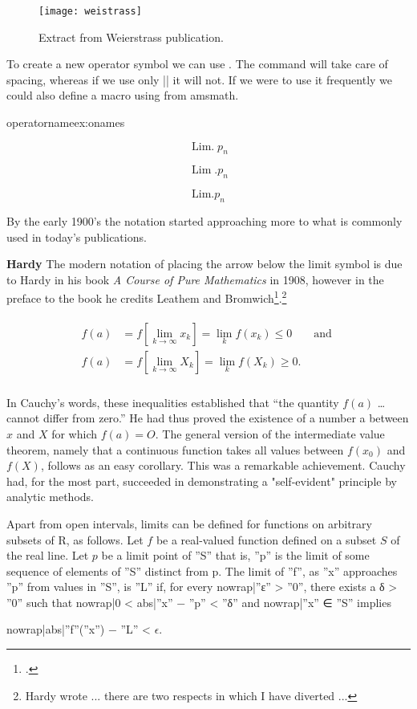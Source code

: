 {\begin{figure}[htbp]
\centering
\texttt{[image: weistrass]}
\caption{Extract from Weierstrass publication.}
\label{weis}

\end{figure}

To create a new operator symbol we can use . The command will take care of spacing, whereas if we use only
|\mathrm| it will not. If we were to use it frequently we could also define a macro using  from amsmath. 

\begin{texexample}{operatorname}{ex:onames}

$$\operatorname{Lim.}p_n$$

$$\operatorname{Lim}.p_n$$

$$\mathrm{Lim.}p_n$$ 
\end{texexample}

By the early 1900's the notation started approaching more to what is commonly used in today's publications.

\textbf{Hardy} The modern notation of placing the arrow below the limit symbol is due to Hardy in his book \emph{A Course of Pure Mathematics} in 1908, however in the preface to the book he credits Leathem and Bromwich\footcite{bromwich}.\footnote{Hardy wrote ... there are two respects in which I have diverted ...} 


\begin{gather}
\begin{aligned}
f(a) &= f\left[\lim_{k\rightarrow\infty} x_k \right]=\lim_{k} f(x_k)\le 0 & \text{ and }\\
f(a) &= f\left[\lim_{k\rightarrow\infty} X_k \right]=\lim_{k} f(X_k)\ge 0. & \\  
\end{aligned}
\end{gather}

In Cauchy's words, these inequalities established that ``the quantity
$f(a)$ \ldots cannot differ from zero.'' He had thus proved the existence of a
number a between $x$ and $X$ for which $f(a) = O$. The general version of the
intermediate value theorem, namely that a continuous function takes all
values between $f(x_0)$ and $f(X)$, follows as an easy corollary.
This was a remarkable achievement. Cauchy had, for the most part,
succeeded in demonstrating a "self-evident" principle by analytic methods.


Apart from open intervals, limits can be defined for functions on arbitrary subsets of R, as follows.  Let $f$ be a real-valued function defined on a subset $S$ of the real line.  Let $p$ be a limit point of ''S'' that is, ''p'' is the limit of some sequence of elements of ''S'' distinct from p.  The limit of ''f'', as ''x'' approaches ''p'' from values in ''S'', is ''L'' if, for every {{nowrap|''ε'' > ''0''}}, there exists a δ > ''0'' such that {{nowrap|0 < {{abs|''x'' − ''p''}} < ''δ''}} and {{nowrap|''x'' ∈ ''S''}} implies {{nowrap|{{abs|''f''(''x'') − ''L''}} < $\epsilon$.

}}}
